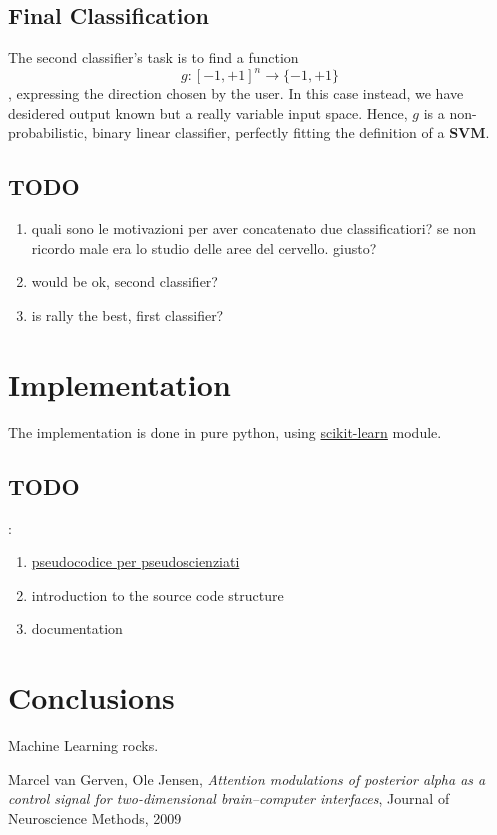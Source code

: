 \documentclass[10pt]{article}
\begin{document}
\subsection{Final Classification}
The second classifier's task is to find a function
 $$
g: [-1, +1]^n \to \{-1, +1\}
$$
    ,  expressing the direction chosen by the user. In this case instead, we have desidered output known but a really variable input space. Hence, $g$ is a non-probabilistic, binary linear classifier, perfectly fitting the definition of a \textbf{SVM}.

\subsection{TODO}
\begin{enumerate}
\item quali sono le motivazioni per aver concatenato due classificatiori? se non ricordo male era lo studio delle aree del cervello. giusto?
\item would be ok, second classifier? 
\item is rally the best, first classifier?
\end{enumerate}

\section{Implementation}
The implementation is done in pure python, using \href{http://scikit-learn.org/stable/}{scikit-learn} module. 

\subsection{TODO}:
\begin{enumerate}
\item  \href{https://en.wikibooks.org/wiki/LaTeX/Algorithms_and_Pseudocode}{pseudocodice per pseudoscienziati}
\item introduction to the source code structure
\item documentation
\end{enumerate}



\section{Conclusions}
Machine Learning rocks.

\begin{thebibliography}{9}

Marcel van Gerven, Ole Jensen,
\emph{Attention modulations of posterior alpha as a control signal for two-dimensional brain–computer interfaces},
Journal of Neuroscience Methods, 2009
\end{thebibliography}
\end{document}
